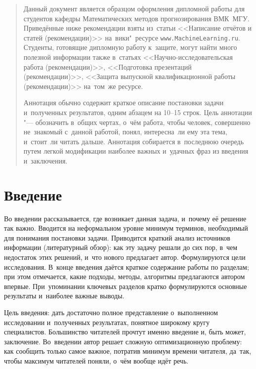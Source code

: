 \documentclass[12pt,fleqn]{article}
\begin{document}
\newpage
\renewcommand{\contentsname}{Содержание}
\tableofcontents

\newpage
\begin{abstract}
    Данный документ является образцом оформления дипломной работы для студентов кафедры 
    Математических методов прогнозирования ВМК~МГУ. 
    Приведённые ниже рекомендации взяты из~статьи
    <<Написание отчётов и статей (рекомендации)>>
    на~вики"~ресурсе \texttt{www.MachineLearning.ru}.
    Студенты, готовящие дипломную работу к~защите, 
    могут найти много полезной информации также в~статьях 
    <<Научно-исследовательская работа (рекомендации)>>,
    <<Подготовка презентаций (рекомендации)>>,
    <<Защита выпускной квалификационной работы (рекомендации)>>
    на~том~же ресурсе. 

    Аннотация обычно содержит 
    краткое описание постановки задачи и~полученных результатов,
    одним абзацем на 10--15 строк.
    Цель аннотации "--- обозначить в~общих чертах, о~чём работа,
    чтобы человек, совершенно не~знакомый с~данной работой,
    понял, интересна~ли ему эта тема, и~стоит~ли читать дальше.
    Аннотация собирается в~последнюю очередь
    путем легкой модификации наиболее важных и~удачных фраз из введения и~заключения.
\end{abstract}

\newpage
\section{Введение}

Во введении рассказывается, где возникает данная задача, и~почему её решение так важно.
Вводится на неформальном уровне минимум терминов, необходимый для понимания постановки задачи.
Приводится краткий анализ источников информации (литературный обзор):
как эту задачу решали до сих пор, в~чем недостаток этих решений, и~что нового предлагает автор.
Формулируются цели исследования. 
В~конце введения даётся краткое содержание работы по разделам; 
при этом отмечается, какие подходы, методы, алгоритмы предлагаются автором впервые. 
При~упоминании ключевых разделов кратко формулируются основные результаты и~наиболее важные выводы.

Цель введения: дать достаточно полное представление о~выполненном исследовании 
и~полученных результатах, понятное широкому кругу специалистов. 
Большинство читателей прочтут именно введение и, быть может, заключение. 
Во~введении автор решает сложную оптимизационную проблему: 
как сообщить только самое важное, потратив минимум времени читателя,
да~так, чтобы максимум читателей поняли, о~чём вообще идёт речь.
\end{document}
